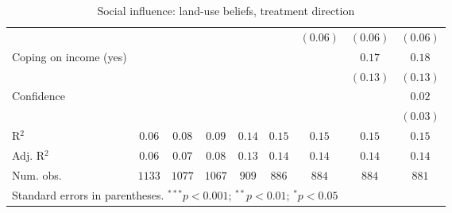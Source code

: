 \begin{table}[h]
\begin{center}
\begin{tabular}{l c c c c c c c c}
                                                                                &              &               &               &               &               & $(0.06)$      & $(0.06)$      & $(0.06)$      \\
Coping on income (yes)                                                          &              &               &               &               &               &               & $0.17$        & $0.18$        \\
                                                                                &              &               &               &               &               &               & $(0.13)$      & $(0.13)$      \\
Confidence                                                                      &              &               &               &               &               &               &               & $0.02$        \\
                                                                                &              &               &               &               &               &               &               & $(0.03)$      \\
\hline
R$^2$                                                                           & $0.06$       & $0.08$        & $0.09$        & $0.14$        & $0.15$        & $0.15$        & $0.15$        & $0.15$        \\
Adj. R$^2$                                                                      & $0.06$       & $0.07$        & $0.08$        & $0.13$        & $0.14$        & $0.14$        & $0.14$        & $0.14$        \\
Num. obs.                                                                       & $1133$       & $1077$        & $1067$        & $909$         & $886$         & $884$         & $884$         & $881$         \\
\hline
\multicolumn{9}{l}{\scriptsize{Standard errors in parentheses. $^{***}p<0.001$; $^{**}p<0.01$; $^{*}p<0.05$}}
\end{tabular}
\caption{Social influence: land-use beliefs, treatment direction}
\label{table:social_influence_landemi_treatment_direction}
\end{center}
\end{table}
